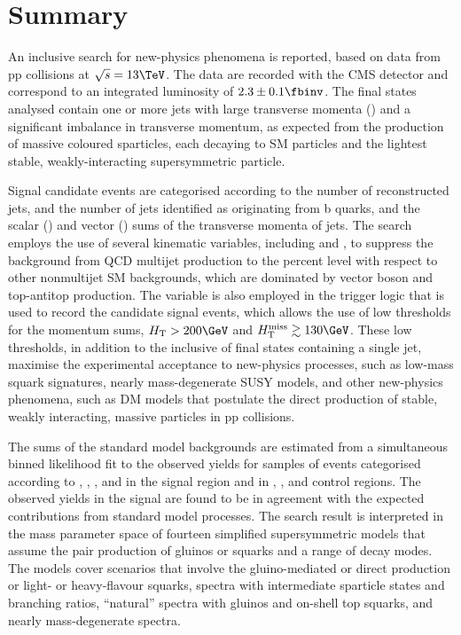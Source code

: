 \section{Summary}
\label{sec:summary}

An inclusive search for new-physics phenomena is reported, based on
data from pp collisions at $\sqrt{s} = 13\TeV$. The data are recorded
with the CMS detector and correspond to an integrated luminosity of
$2.3 \pm 0.1 \fbinv$. The final states analysed contain one or more
jets with large transverse momenta (\Pt) and a significant imbalance
in transverse momentum, as expected from the production of massive
coloured sparticles, each decaying to SM particles and the lightest
stable, weakly-interacting supersymmetric particle.

Signal candidate events are categorised according to the number of
reconstructed jets, and the number of jets identified as originating
from b quarks, and the scalar (\scalht) and vector (\HTmiss) sums of
the transverse momenta of jets. 
The search employs the use of several kinematic variables, including
\alphat and \bdphi, to suppress the background from QCD multijet
production to the percent level with respect to other nonmultijet SM
backgrounds, which are dominated by vector boson and top-antitop
production. The \alphat variable is also employed in the trigger logic
that is used to record the candidate signal events, which allows the
use of low thresholds for the momentum sums, $\scalht > 200\GeV$ and
$\HTmiss \gtrsim 130\GeV$. These low thresholds, in addition to the
inclusive of final states containing a single jet, maximise the
experimental acceptance to new-physics processes, such as low-mass
squark signatures, nearly mass-degenerate SUSY models, and other
new-physics phenomena, such as DM models that postulate the direct
production of stable, weakly interacting, massive particles in pp
collisions.

The sums of the standard model backgrounds are estimated from a
simultaneous binned likelihood fit to the observed yields for samples
of events categorised according to \njet, \nb, \scalht, and \HTmiss in
the signal region and in \mj, \mmj, and \gj control regions. The
observed yields in the signal are found to be in agreement with the
expected contributions from standard model processes.  The search
result is interpreted in the mass parameter space of fourteen 
simplified supersymmetric models that assume the pair production of
gluinos or squarks and a range of decay modes. The models cover
scenarios that involve the gluino-mediated or direct production or
light- or heavy-flavour squarks, spectra with intermediate sparticle
states and branching ratios, ``natural'' spectra with gluinos and
on-shell top squarks, and nearly mass-degenerate spectra.

